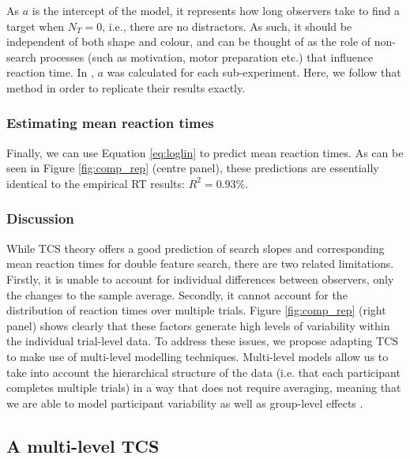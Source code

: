 \documentclass[preprint,12pt,authoryear]{elsarticle}
\begin{document}
As $a$ is the intercept of the model, it represents how long observers take to find a target when $N_T = 0$, i.e., there are no distractors. As such, it should be independent of both shape and colour, and can be thought of as the role of non-search processes (such as motivation, motor preparation etc.) that influence reaction time. In \cite{buetti2019predicting}, $a$ was calculated for each sub-experiment. Here, we follow that method in order to replicate their results exactly. 

\subsubsection{Estimating mean reaction times}

Finally, we can use Equation \ref{eq:loglin} to predict mean reaction times. As can be seen in  Figure \ref{fig:comp_rep} (centre panel), these predictions are essentially identical to the empirical RT results: $R^2 = 0.93\%$.

\subsubsection{Discussion}

While TCS theory offers a good prediction of search slopes and corresponding mean reaction times for double feature search, there are two related limitations. Firstly, it is unable to account for individual differences between observers, only the changes to the sample average. Secondly, it cannot account for the distribution of reaction times over multiple trials. Figure \ref{fig:comp_rep} (right panel) shows clearly that these factors generate high levels of variability within the individual trial-level data. To address these issues, we propose adapting TCS to make use of multi-level modelling techniques. Multi-level models allow us to take into account the hierarchical structure of the data (i.e. that each participant completes multiple trials) in a way that does not require averaging, meaning that we are able to model participant variability as well as group-level effects \citep{gelman2006data}.

\subsection {A multi-level TCS}
\end{document}
